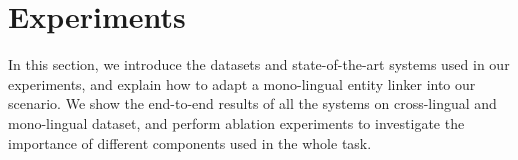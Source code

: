 \section{Experiments}
\label{sec:eval}



In this section, we introduce the datasets and state-of-the-art systems used in our experiments,
and explain how to adapt a mono-lingual entity linker into our scenario.
We show the end-to-end results of all the systems on cross-lingual and mono-lingual dataset, 
and perform ablation experiments to investigate the importance of different components used in the whole task.












